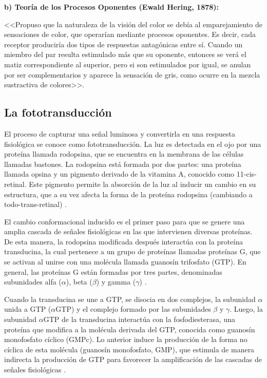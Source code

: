 \documentclass[10pt]{article}
\begin{document}
\setlength{\parskip}{2mm}

\textbf{b) Teoría de los Procesos Oponentes (Ewald Hering, 1878):}
 
<<Propuso que la naturaleza de la visión del color se debía al emparejamiento de sensaciones de color, que operarían mediante procesos oponentes. Es decir, cada receptor produciría dos tipos de respuestas antagónicas entre sí. Cuando un miembro del par resulta estimulado más que su oponente, entonces se verá el matiz correspondiente al superior, pero si son estimulados por igual, se anulan por ser complementarios y aparece la sensación de gris, como ocurre en la mezcla sustractiva de colores>>\cite{IEEEreferencias:Ref14}.

\subsection{La fototransducción}

El proceso de capturar una señal luminosa y convertirla en una respuesta fisiológica se conoce como fototransducción. La luz es detectada en el ojo por una proteína llamada rodopsina, que se encuentra en la membrana de las células llamadas bastones. La rodopsina está formada por dos partes: una proteína llamada opsina y un pigmento derivado de la vitamina A, conocido como 11-cis-retinal. Este pigmento permite la absorción de la luz al inducir un cambio en su estructura, que a su vez afecta la forma de la proteína rodopsina (cambiando a todo-trans-retinal) \cite{IEEEreferencias:Ref12}.

\setlength{\parskip}{2mm}

El cambio conformacional inducido es el primer paso para que se genere una amplia cascada de señales fisiológicas en las que intervienen diversas proteínas. De esta manera, la rodopsina modificada después interactúa con la proteína transducina, la cual pertenece a un grupo de proteínas llamadas proteínas G, que se activan al unirse con una molécula llamada guanosín trifosfato (GTP). En general, las proteínas G están formadas por tres partes, denominadas subunidades alfa ($\alpha$), beta ($\beta$) y gamma ($\gamma$) \cite{IEEEreferencias:Ref12}. 

\setlength{\parskip}{2mm}

Cuando la transducina se une a GTP, se disocia en dos complejos, la subunidad $\alpha$ unida a GTP
($\alpha$GTP) y el complejo formado por las subunidades $\beta$ y $\gamma$. Luego, la subunidad $\alpha$GTP de la transducina interactúa con la fosfodiesterasa, una proteína que modifica a la molécula derivada del GTP, conocida como guanosín monofosfato cíclico (GMPc). Lo anterior induce la producción de la forma no cíclica de esta molécula (guanosín monofosfato, GMP), que estimula de manera indirecta la producción de GTP para favorecer la amplificación de las cascadas de señales fisiológicas \cite{IEEEreferencias:Ref12}.
\end{document}
